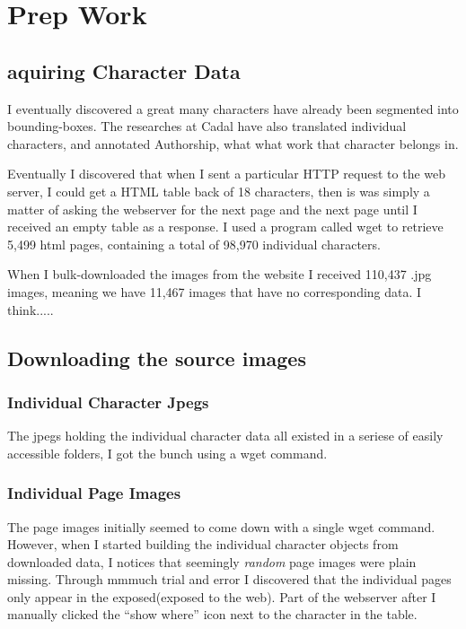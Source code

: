 \chapter{Prep Work}


\section{aquiring Character Data}

I eventually discovered a great many characters have already been segmented into bounding-boxes.  The researches at Cadal have also translated individual characters, and annotated Authorship, what what work that character belongs in.

Eventually I discovered that when I sent a particular HTTP request to the web server, I could get a HTML table back of 18 characters,  then is was simply a matter of asking the webserver for the next page and the next page until I received an empty table as a response.  I used a program called wget to retrieve 5,499 html pages, containing a total of 98,970 individual characters.

When I bulk-downloaded the images from the website I received 110,437 .jpg images, meaning we have 11,467 images that have no corresponding data.  I think.....

\section{Downloading the source images}

\subsection{Individual Character Jpegs}
The jpegs holding the individual character data all existed in a seriese of easily accessible folders,  I got the bunch using a wget command.

\subsection{Individual Page Images}
The page images initially seemed to come down with a single wget command.  However, when I started building the individual character objects from downloaded data, I notices that seemingly \textit{random} page images were plain missing.  Through mmmuch trial and error I discovered that the individual pages only appear in the exposed(exposed to the web).  Part of the webserver after I manually clicked the ``show where'' icon next to the character in the table.

